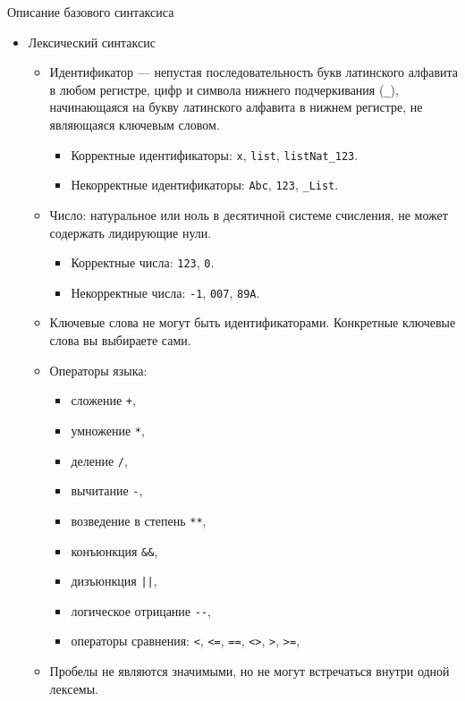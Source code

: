 \documentclass[12pt]{article}
\begin{document}
\begin{center}
  {\Large Описание базового синтаксиса}
\end{center}
\begin{itemize}
  \item Лексический синтаксис
  \begin{itemize}
    \item Идентификатор --- непустая последовательность букв латинского алфавита в любом регистре, цифр и символа нижнего подчеркивания (\verb!_!), начинающаяся на букву латинского алфавита в нижнем регистре, не являющаяся ключевым словом.
    \begin{itemize}
      \item Корректные идентификаторы: \verb!x!, \verb!list!, \verb!listNat_123!.
      \item Некорректные идентификаторы: \verb!Abc!, \verb!123!, \verb!_List!.
    \end{itemize}
    \item Число: натуральное или ноль в десятичной системе счисления, не может содержать лидирующие нули.
    \begin{itemize}
      \item Корректные числа: \verb!123!, \verb!0!.
      \item Некорректные числа: \verb!-1!, \verb!007!, \verb!89A!.
    \end{itemize}
    \item Ключевые слова не могут быть идентификаторами. Конкретные ключевые слова вы выбираете сами.
    \item Операторы языка:
      \begin{itemize}
        \item сложение \verb!+!,
        \item умножение \verb!*!,
        \item деление \verb!/!,
        \item вычитание \verb!-!,
        \item возведение в степень \verb!**!,
        \item конъюнкция \verb!&&!,
        \item дизъюнкция \verb!||!,
        \item логическое отрицание \verb!--!,
        \item операторы сравнения: \verb!<!, \verb!<=!, \verb!==!, \verb!<>!, \verb!>!, \verb!>=!,
      \end{itemize}
    \item Пробелы не являются значимыми, но не могут встречаться внутри одной лексемы.

\end{itemize}
\end{itemize}
\end{document}
